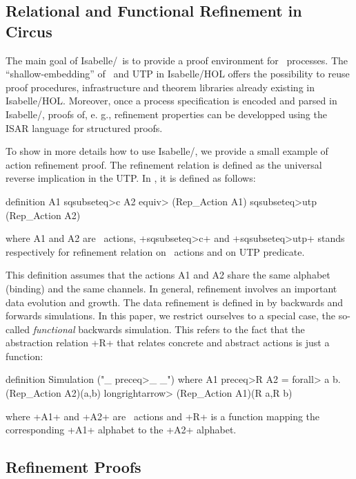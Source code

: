 \documentclass[11pt,a4paper]{article}
\begin{document}
\subsection{Relational and Functional Refinement in Circus}

The main goal of  Isabelle/\Circus\  is to provide a proof environment for \Circus\ processes. The ``shallow-embedding'' of \Circus\ and UTP in Isabelle/HOL offers the 
possibility to reuse proof procedures, infrastructure and theorem libraries already existing in Isabelle/HOL. Moreover, once a process specification is encoded and parsed in 
Isabelle/\Circus , proofs of, e. g., refinement properties can be developped using the ISAR language for structured proofs. 

To show in more details how to use  Isabelle/\Circus , we provide a small example of action refinement proof. The refinement relation is defined as the universal reverse implication in the UTP. 
In \Circus , %
it is defined as follows: 

\begin{isar}
definition A1 \<sqsubseteq>c A2 \<equiv>  (Rep_Action A1) \<sqsubseteq>utp (Rep_Action A2)
\end{isar}
where A1 and A2 are \Circus\ actions, \inlineisar+\<sqsubseteq>c+ and \inlineisar+\<sqsubseteq>utp+ stands respectively for refinement relation on \Circus\ actions and on UTP predicate.

This definition assumes that the actions A1 and A2 share the same alphabet (binding) and the same channels. In general, refinement involves an important data evolution and growth. 
The data refinement is defined in \cite{SWC02,CSW03} by backwards and forwards simulations. In this paper, we %
restrict ourselves to a special case, the so-called \emph{functional} 
backwards simulation. This refers to the fact that the abstraction relation \inlineisar+R+ that relates concrete and abstract actions is just a function: 
\begin{isar}
definition Simulation ("_ \<preceq>_ _") where 
 A1 \<preceq>R A2 = \<forall> a b.(Rep_Action A2)(a,b) \<longrightarrow>    (Rep_Action A1)(R a,R b)
\end{isar}
where \inlineisar+A1+ and \inlineisar+A2+ are \Circus\ actions and  \inlineisar+R+ is a function mapping the corresponding \inlineisar+A1+ alphabet to the \inlineisar+A2+ alphabet.

\subsection{Refinement Proofs}
\end{document}
